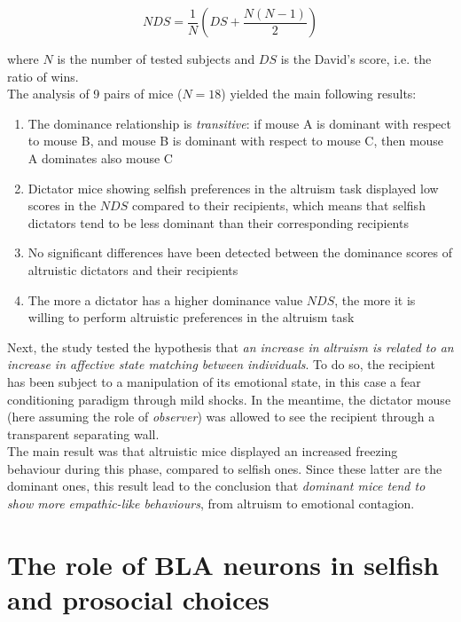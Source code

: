 \documentclass[12pt, a4paper]{report}
\begin{document}
\begin{equation}
NDS = \frac{1}{N}\left(DS + \frac{N(N-1)}{2}\right)
\end{equation}

where $N$ is the number of tested subjects and $DS$ is the David's score, i.e. the ratio of wins.\\
The analysis of 9 pairs of mice ($N=18$) yielded the main following results:

\begin{enumerate}
	\item The dominance relationship is \textit{transitive}: if mouse A is dominant with respect to mouse B, and mouse B is dominant with respect to mouse C, then mouse A dominates also mouse C 
	
	\item Dictator mice showing selfish preferences in the altruism task displayed low scores in the $NDS$ compared to their recipients, which means that selfish dictators  tend to be less dominant than their corresponding recipients
	
	\item No significant differences have been detected between the dominance scores of altruistic dictators and their recipients
	
	\item The more a dictator has a higher dominance value $NDS$, the more it is willing to perform altruistic preferences in the altruism task
	
\end{enumerate}

Next, the study tested the hypothesis that \textit{an increase in altruism is related to an increase in affective state matching between individuals}. To do so, the recipient has been subject to a manipulation of its emotional state, in this case a fear conditioning paradigm through mild shocks. In the meantime, the dictator mouse (here assuming the role of \textit{observer}) was allowed to see the recipient through a transparent separating wall.\\
The main result was that altruistic mice displayed an increased freezing behaviour during this phase, compared to selfish ones. Since these latter are the dominant ones, this result lead to the conclusion that \textit{dominant mice tend to show more empathic-like behaviours}, from altruism to emotional contagion.

\section{The role of BLA neurons in selfish and prosocial choices}
\end{document}
